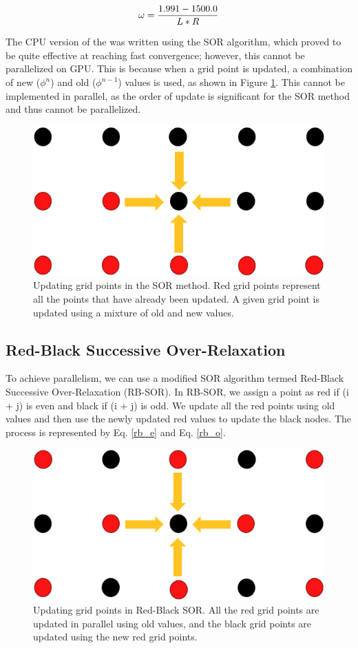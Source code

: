 \begin{equation}{\label{omg}}
\omega = \frac{1.991 - 1500.0}{L*R}
\end{equation}

The CPU version of the {\ehd} was written using the SOR algorithm, which proved to be quite effective at reaching fast convergence; however, this cannot be parallelized on GPU. This is because when a grid point is updated, a combination of new ($\phi^{n}$) and old ($\phi^{n-1}$) values is used, as shown in Figure \ref{fig:sor_methods}. This cannot be implemented in parallel, as the order of update is significant for the SOR method and thus cannot be parallelized.


\begin{figure}[!htb]
\centering
\includegraphics[width=0.4\linewidth]{ch4/figs/SOR.png}
\caption{\label{fig:sor_methods} Updating grid points in the SOR method. Red grid points represent all the points that have already been updated. A given grid point is updated using a mixture of old and new values.}
\end{figure}

\subsection*{Red-Black Successive Over-Relaxation}
To achieve parallelism, we can use a modified SOR algorithm termed Red-Black Successive Over-Relaxation (RB-SOR). In RB-SOR, we assign a point as red if (i + j) is even and black if (i + j) is odd. We update all the red points using old values and then use the newly updated red values to update the black nodes. The process is represented by Eq. \ref{rb_e} and Eq. \ref{rb_o}.


\begin{figure}[!htb]
\centering
 \includegraphics[width=0.4\linewidth]{ch4/figs/RB-SOR.png}
\caption{\label{fig:rb_sor_methods} Updating grid points in Red-Black SOR. All the red grid points are updated in parallel using old values, and the black grid points are updated using the new red grid points.}
\end{figure}

